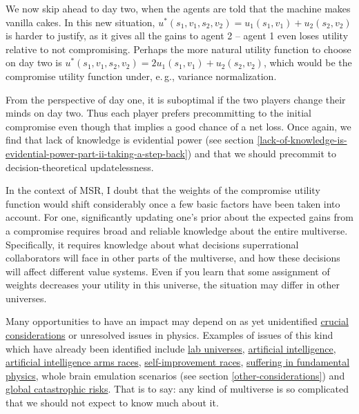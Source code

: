 We now skip ahead to day two, when the agents are told that the machine
makes vanilla cakes. In this new situation,
\(u^{*}(s_{1},v_{1},s_{2},v_{2}) = u_{1}(s_{1},v_{1}) + u_{2}(s_{2},v_{2})\)
is harder to justify, as it gives all the gains to agent 2 -- agent 1
even loses utility relative to not compromising. Perhaps the more
natural utility function to choose on day two is
\(u^{*}(s_{1},v_{1},s_{2},v_{2}) = {2u}_{1}(s_{1},v_{1}) + u_{2}(s_{2},v_{2})\),
which would be the compromise utility function under, e.\,g., variance
normalization.

From the perspective of day one, it is suboptimal if the two players
change their minds on day two. Thus each player prefers precommitting to
the initial compromise even though that implies a good chance of a net
loss. Once again, we find that lack of knowledge is evidential power
(see section
\ref{lack-of-knowledge-is-evidential-power-part-ii-taking-a-step-back}) and
that we should precommit to decision-theoretical updatelessness.

In the context of MSR, I doubt that the weights of the compromise
utility function would shift considerably once a few basic factors have
been taken into account. For one, significantly updating one's prior
about the expected gains from a compromise requires broad and reliable
knowledge about the entire multiverse. Specifically, it requires
knowledge about what decisions superrational collaborators will face in
other parts of the multiverse, and how these decisions will affect
different value systems. Even if you learn that some assignment of
weights decreases your utility in this universe, the situation may
differ in other universes.

Many opportunities to have an impact may depend on as yet unidentified
\href{https://casparoesterheld.files.wordpress.com/2016/11/crucialconsiderations1.pdf}{crucial
considerations} or unresolved issues in physics. Examples of issues of
this kind which have already been identified include
\href{http://reducing-suffering.org/lab-universes-creating-infinite-suffering/}{lab
universes},
\href{https://foundational-research.org/why-altruists-should-focus-on-artificial-intelligence/}{artificial
intelligence},
\href{https://wiki.lesswrong.com/wiki/AI_arms_race}{artificial
intelligence arms races},
\href{https://casparoesterheld.com/2016/07/04/self-improvement-races/}{self-improvement
races},
\href{http://reducing-suffering.org/is-there-suffering-in-fundamental-physics/}{suffering
in fundamental physics}, whole
brain emulation scenarios (see section
\ref{other-considerations}) and
\href{https://en.wikipedia.org/wiki/Global_catastrophic_risk}{global
catastrophic risks}. That is to say: any kind of multiverse is so
complicated that we should not expect to know much about it.

